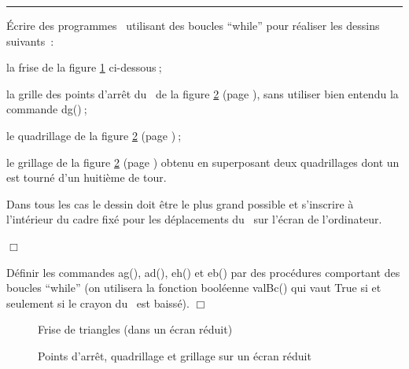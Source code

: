 %
  
\clearpage
\noindent \rule{137mm}{0.1mm} %
\begin{exercices}{Écrire des programmes \python\  utilisant des boucles ``while'' pour réaliser les
dessins suivants~:

\tiret  la frise de la figure \ref{fig:FriTri} ci-dessous$\:$;

\tiret  la grille des points d'arrêt du \robot\ de la figure \ref{fig:DgQuGr} (page \pageref{fig:DgQuGr}),
sans utiliser bien entendu la commande {\idt dg()}$\:$;

\tiret  le quadrillage de la figure \ref{fig:DgQuGr} (page \pageref{fig:DgQuGr})$\:$;

\tiret  le grillage de la figure \ref{fig:DgQuGr} (page \pageref{fig:DgQuGr}) obtenu en superposant deux
qua\-dril\-la\-ges dont un est tourné d'un huitième de tour.

Dans tous les cas le dessin doit être le plus grand possible et s'inscrire à l'intérieur du cadre fixé pour les
déplacements du \robot\ sur l'écran de l'ordinateur.

\noindent $\Box$}\end{exercices}

\vspace*{-1ex}%
\begin{exercice}{Définir les commandes {\idt ag()},  {\idt ad()},  {\idt eh()} et  {\idt eb()} par des procédures comportant
des boucles ``while'' (on utilisera la fonction booléenne {\idt valBc()} qui vaut {\mcl True} si et
seulement si le crayon du \robot\ est baissé).
\noindent $\Box$}\end{exercice}

\begin{figure}[htbp]
 \caption{Frise de triangles (dans un écran réduit)}\label{fig:FriTri}
\end{figure}
\begin{figure}[htbp]
 \caption{Points d'arrêt, quadrillage et grillage sur un écran réduit}\label{fig:DgQuGr}
\end{figure}

